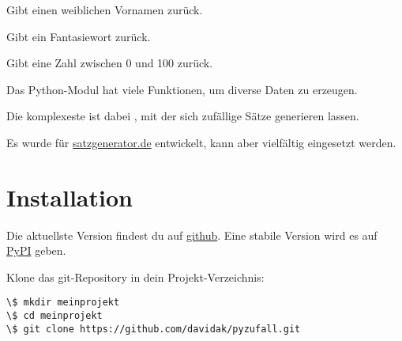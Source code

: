 \documentclass[a4paper,12pt,oneside]{sphinxmanual}
\begin{document}

\begin{fulllineitems}
\label{funktionen:pyzufall.vorname_w}
Gibt einen weiblichen Vornamen zurück.

\end{fulllineitems}


\begin{fulllineitems}
\label{funktionen:pyzufall.wort}
Gibt ein Fantasiewort zurück.

\end{fulllineitems}


\begin{fulllineitems}
\label{funktionen:pyzufall.zahl}
Gibt eine Zahl zwischen 0 und 100 zurück.

\end{fulllineitems}


Das Python-Modul {\hyperref[funktionen:module-pyzufall]{}} hat viele Funktionen, um diverse Daten zu erzeugen.

Die komplexeste ist dabei {\hyperref[funktionen:pyzufall.satz]{}}, mit der sich zufällige Sätze generieren lassen.

Es wurde für \href{http://satzgenerator.de/}{satzgenerator.de} entwickelt, kann aber vielfältig eingesetzt werden.


\chapter{Installation}
\label{index:installation}
Die aktuellste Version findest du auf \href{https://github.com/davidak/pyzufall}{github}. Eine stabile Version wird es auf \href{https://pypi.python.org/}{PyPI} geben.

Klone das git-Repository in dein Projekt-Verzeichnis:

\begin{Verbatim}[commandchars=\\\{\}]
\$ mkdir meinprojekt
\$ cd meinprojekt
\$ git clone https://github.com/davidak/pyzufall.git
\end{Verbatim}
\end{document}

